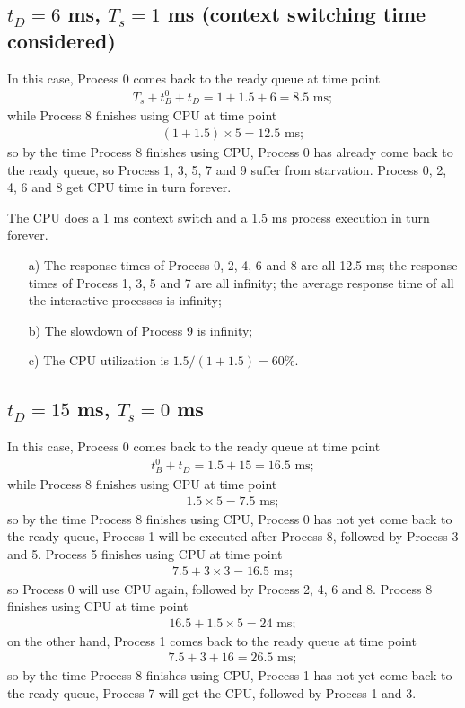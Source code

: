 \documentclass[12pt,letterpaper]{article}
\begin{document}
\subsection{$t_D=6$ ms, $T_s = 1$ ms (context switching time considered)} 
In this case, Process 0 comes back to the ready queue at time point
\begin{eqnarray}
T_s+t_B^0+t_D=1+1.5+6=8.5\textrm{ ms};
\end{eqnarray}
while Process 8 finishes using CPU at time point 
\begin{eqnarray}
(1+1.5)\times5=12.5\textrm{ ms};
\end{eqnarray}
so by the time Process 8 finishes using CPU, Process 0 has already come back to the ready queue, so Process 1, 3, 5, 7 and 9 suffer from starvation. Process 0, 2, 4, 6 and 8 get CPU time in turn forever.

The CPU does a 1 ms context switch and a 1.5 ms process execution in turn forever.

\begin{enumerate}
\item[a)] The response times of Process 0, 2, 4, 6 and 8 are all 12.5 ms; the response times of Process 1, 3, 5 and 7 are all infinity; the average response time of all the interactive processes is infinity;
\item[b)] The slowdown of Process 9 is infinity;
\item[c)] The CPU utilization is $1.5/(1+1.5)=60\%$.
\end{enumerate}

\subsection{$t_D=15$ ms, $T_s = 0$ ms}
In this case, Process 0 comes back to the ready queue at time point
\begin{eqnarray}
t_B^0+t_D=1.5+15=16.5\textrm{ ms};
\end{eqnarray}
while Process 8 finishes using CPU at time point 
\begin{eqnarray}
1.5\times5=7.5\textrm{ ms};
\end{eqnarray}
so by the time Process 8 finishes using CPU, Process 0 has not yet come back to the ready queue, Process 1 will be executed after Process 8, followed by Process 3 and 5. Process 5 finishes using CPU at time point
\begin{eqnarray}
7.5+3\times3=16.5\textrm{ ms};
\end{eqnarray}
so Process 0 will use CPU again, followed by Process 2, 4, 6 and 8. Process 8 finishes using CPU at time point
\begin{eqnarray}
16.5+1.5\times5=24\textrm{ ms};
\end{eqnarray}
on the other hand, Process 1 comes back to the ready queue at time point
\begin{eqnarray}
7.5+3+16=26.5\textrm{ ms};
\end{eqnarray}
so by the time Process 8 finishes using CPU, Process 1 has not yet come back to the ready queue, Process 7 will get the CPU, followed by Process 1 and 3.
\end{document}
